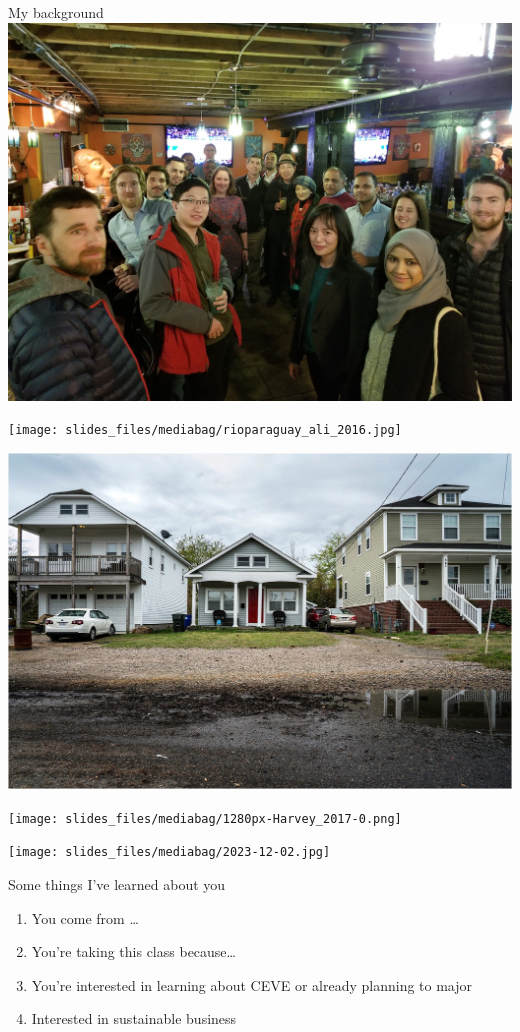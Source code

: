 \documentclass[
  ignorenonframetext,
]{beamer}
\providecommand{\tightlist}{%
  \setlength{\itemsep}{0pt}\setlength{\parskip}{0pt}}\usepackage{longtable,booktabs,array}
\begin{document}
\begin{frame}{My background}
\includegraphics{cwc-agu.JPG}

\texttt{[image: slides\_files/mediabag/rioparaguay\_ali\_2016.jpg]}

\includegraphics{selinsgrove.jpg}

\texttt{[image: slides\_files/mediabag/1280px-Harvey\_2017-0.png]}

\texttt{[image: slides\_files/mediabag/2023-12-02.jpg]}
\end{frame}

\begin{frame}{Some things I've learned about you}
\label{some-things-ive-learned-about-you}
\begin{enumerate}[<+->]
\tightlist
\item
  You come from \ldots{}
\item
  You're taking this class because\ldots{}
\item
  You're interested in learning about CEVE or already planning to major
\item
  Interested in sustainable business
\end{enumerate}
\end{frame}
\end{document}
